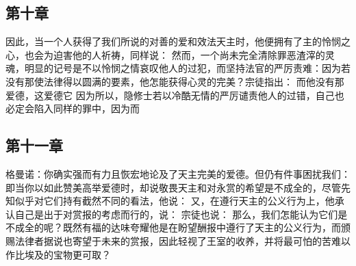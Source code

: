 \subsection{第十章}

\par

因此，当一个人获得了我们所说的对善的爱和效法天主时，他便拥有了主的怜悯之心，也会为迫害他的人祈祷，同样说： 然而，一个尚未完全清除罪恶渣滓的灵魂，明显的记号是不以怜悯之情哀叹他人的过犯，而坚持法官的严厉责难：因为若没有那使法律得以圆满的要素，他怎能获得心灵的完美？宗徒指出： 而他没有那爱德，这爱德它 因为所以，隐修士若以冷酷无情的严厉谴责他人的过错，自己也必定会陷入同样的罪中，因为而\par


\subsection{第十一章}

\par

格曼诺：你确实强而有力且恢宏地论及了天主完美的爱德。但仍有件事困扰我们：即当你以如此赞美高举爱德时，却说敬畏天主和对永赏的希望是不成全的，尽管先知似乎对它们持有截然不同的看法，他说： 又，在遵行天主的公义行为上，他承认自己是出于对赏报的考虑而行的，说： 宗徒也说：  那么，我们怎能认为它们是不成全的呢？既然有福的达味夸耀他是在盼望酬报中遵行了天主的公义行为，而颁赐法律者据说也寄望于未来的赏报，因此轻视了王室的收养，并将最可怕的苦难以作比埃及的宝物更可取？\par


